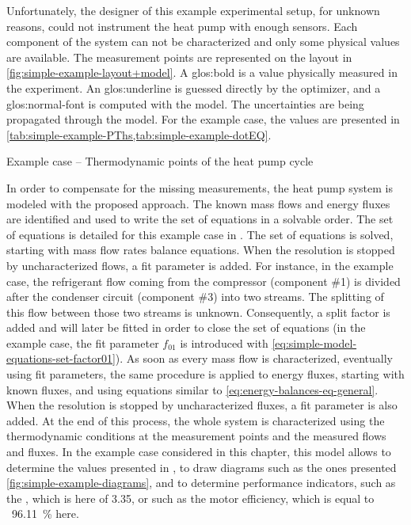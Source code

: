 Unfortunately, the designer of this example experimental setup, for
unknown reasons, could not instrument the heat pump with enough
sensors. Each component of the system can not be characterized and
only some physical values are available. The measurement points are
represented on the layout in \cref{fig:simple-example-layout+model}. A
\gls{glos:bold} is a value physically measured in the experiment. An
\gls{glos:underline} is guessed directly by the optimizer, and a
\gls{glos:normal-font} is computed with the model. The uncertainties are
being propagated through the model. For the example case, the values are presented in
\cref{tab:simple-example-PThs,tab:simple-example-dotEQ}.

\begin{table}[ht!]
  \footnotesize
  \begin{center}
    
  \end{center}
  \caption{Example case -- Thermodynamic points of the heat pump cycle}
  \label{tab:simple-example-PThs}
\end{table}

In order to compensate for the missing measurements, the heat pump
system is modeled with the proposed approach. The known mass flows and
energy fluxes are identified and used to write the set of equations in
a solvable order. The set of equations is detailed for this example
case in . The set of equations
is solved, starting with mass flow rates balance equations. When the
resolution is stopped by uncharacterized flows, a fit parameter is
added. For instance, in the example case, the refrigerant flow coming
from the compressor (component \#1) is divided after the condenser
circuit (component \#3) into two streams. The splitting of this flow
between those two streams is unknown. Consequently, a split factor is
added and will later be fitted in order to close the set of equations
(in the example case, the fit parameter $f_{01}$ is introduced with
\cref{eq:simple-model-equations-set-factor01}). As soon as every mass
flow is characterized, eventually using fit parameters, the same
procedure is applied to energy fluxes, starting with known fluxes, and
using equations similar to \cref{eq:energy-balances-eq-general}. When
the resolution is stopped by uncharacterized fluxes, a fit parameter
is also added. At the end of this process, the whole system is
characterized using the thermodynamic conditions at the measurement
points and the measured flows and fluxes. In the example case
considered in this chapter, this model allows to determine the values
presented in
, to draw
diagrams such as the ones presented
\cref{fig:simple-example-diagrams}, and to determine performance
indicators, such as the \COP{}, which is here of 3.35, or such as the
motor efficiency, which is equal to ~\SI{96.11}{\%}
here.

